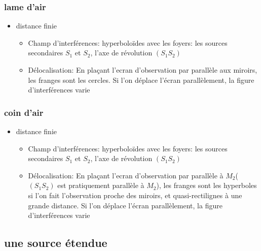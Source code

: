 \documentclass[a4paper,12pt]{book}
\begin{document}
\subsubsection{lame d'air}
\begin{itemize}
    \item distance finie
        \begin{itemize}
            \item Champ d'interférences: hyperboloïdes avec les foyers: les sources secondaires
                    $S_1$ et $S_2$, l'axe de révolution $(S_1S_2)$
            \item Délocalisation: En plaçant l'ecran d'observation par parallèle aux miroirs, les franges sont les cercles. 
                    Si l'on déplace l'écran parallèlement, la figure d'interférences varie 
        \end{itemize}
\end{itemize}
\subsubsection{coin d'air}
\begin{itemize}
    \item distance finie
        \begin{itemize}
            \item Champ d'interférences: hyperboloïdes avec les foyers: les sources secondaires
                    $S_1$ et $S_2$, l'axe de révolution $(S_1S_2)$
            \item Délocalisation: En plaçant l'ecran d'observation par parallèle à $M_2$($(S_1S_2)$ est pratiquement parallèle à $M_2$), les franges sont les hyperboles 
            si l'on fait l'observation proche des miroirs, et quasi-rectilignes à une grande distance. 
                    Si l'on déplace l'écran parallèlement, la figure d'interférences varie 
        \end{itemize}
\end{itemize}
\subsection{une source étendue}
\end{document}
